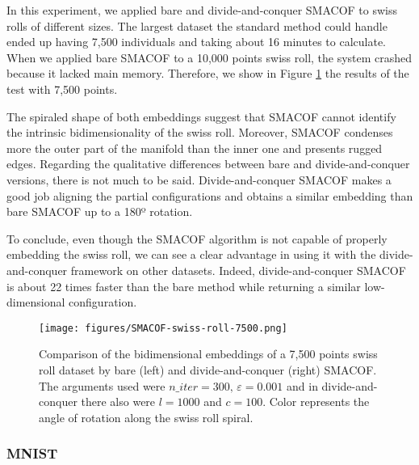 In this experiment, we applied bare and divide-and-conquer SMACOF to swiss rolls of different sizes. The largest dataset the standard method could handle ended up having 7,500 individuals and taking about 16 minutes to calculate. When we applied bare SMACOF to a 10,000 points swiss roll, the system crashed because it lacked main memory. Therefore, we show in Figure \ref{fig:SMACOF-swiss-roll-7500} the results of the test with 7,500 points.

The spiraled shape of both embeddings suggest that SMACOF cannot identify the intrinsic bidimensionality of the swiss roll. Moreover, SMACOF condenses more the outer part of the manifold than the inner one and presents rugged edges. Regarding the qualitative differences between bare and divide-and-conquer versions, there is not much to be said. Divide-and-conquer SMACOF makes a good job aligning the partial configurations and obtains a similar embedding than bare SMACOF up to a 180º rotation.

To conclude, even though the SMACOF algorithm is not capable of properly embedding the swiss roll, we can see a clear advantage in using it with the divide-and-conquer framework on other datasets. Indeed, divide-and-conquer SMACOF is about 22 times faster than the bare method while returning a similar low-dimensional configuration.

\begin{figure}[ht]
    \centering
    \texttt{[image: figures/SMACOF-swiss-roll-7500.png]}
    \caption{Comparison of the bidimensional embeddings of a 7,500 points swiss roll dataset \citep{Spiwokv2007} by bare (left) and divide-and-conquer (right) SMACOF. The arguments used were $n\_iter = 300,\, \varepsilon = 0.001$ and in divide-and-conquer there also were $l=1000$ and $c=100$. Color represents the angle of rotation along the swiss roll spiral.}
    \label{fig:SMACOF-swiss-roll-7500}
\end{figure}


\subsubsection{MNIST}
\label{sec:dc-SMACOF-MNIST}

